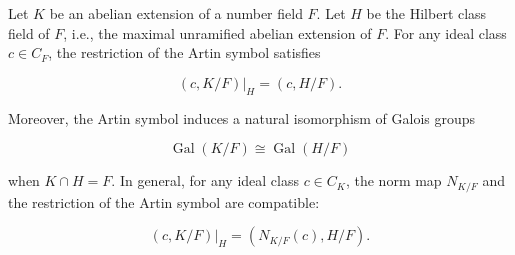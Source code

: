 Let $K$ be an abelian extension of a number field $F$. Let $H$ be the Hilbert class field of $F$, i.e., the maximal unramified abelian extension of $F$. For any ideal class $c \in C_F$, the restriction of the Artin symbol satisfies

$$
(c, K/F) \big|_H = (c, H/F).
$$

Moreover, the Artin symbol induces a natural isomorphism of Galois groups

$$
\operatorname{Gal}(K/F) \cong \operatorname{Gal}(H/F)
$$

when $K \cap H = F$. In general, for any ideal class $c \in C_K$, the norm map $N_{K/F}$ and the restriction of the Artin symbol are compatible:

$$
(c, K/F) \big|_H = (N_{K/F}(c), H/F).
$$
